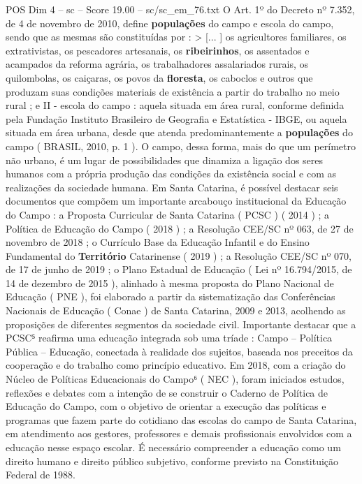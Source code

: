 \begin{textsample}{POS Dim 4 – sc – Score 19.00 – sc/sc\_em\_76.txt}
O Art. 1º do Decreto nº 7.352, de 4 de novembro de 2010, define \textbf{populações} do campo e escola do campo, sendo que as mesmas são constituídas por : > [... ] os agricultores familiares, os extrativistas, os pescadores artesanais, os \textbf{ribeirinhos}, os assentados e acampados da reforma agrária, os trabalhadores assalariados rurais, os quilombolas, os caiçaras, os povos da \textbf{floresta}, os caboclos e outros que produzam suas condições materiais de existência a partir do trabalho no meio rural ; e II - escola do campo : aquela situada em área rural, conforme definida pela Fundação Instituto Brasileiro de Geografia e Estatística - IBGE, ou aquela situada em área urbana, desde que atenda predominantemente a \textbf{populações} do campo ( BRASIL, 2010, p. 1 ).
O campo, dessa forma, mais do que um perímetro não urbano, é um lugar de possibilidades que dinamiza a ligação dos seres humanos com a própria produção das condições da existência social e com as realizações da sociedade humana.
Em Santa Catarina, é possível destacar seis documentos que compõem um importante arcabouço institucional da Educação do Campo : a Proposta Curricular de Santa Catarina ( PCSC ) ( 2014 ) ; a Política de Educação do Campo ( 2018 ) ; a Resolução CEE/SC nº 063, de 27 de novembro de 2018 ; o Currículo Base da Educação Infantil e do Ensino Fundamental do \textbf{Território} Catarinense ( 2019 ) ; a Resolução CEE/SC nº 070, de 17 de junho de 2019 ; o Plano Estadual de Educação ( Lei nº 16.794/2015, de 14 de dezembro de 2015 ), alinhado à mesma proposta do Plano Nacional de Educação ( PNE ), foi elaborado a partir da sistematização das Conferências Nacionais de Educação ( Conae ) de Santa Catarina, 2009 e 2013, acolhendo as proposições de diferentes segmentos da sociedade civil.
Importante destacar que a PCSC⁵ reafirma uma educação integrada sob uma tríade : Campo – Política Pública – Educação, conectada à realidade dos sujeitos, baseada nos preceitos da cooperação e do trabalho como princípio educativo.
Em 2018, com a criação do Núcleo de Políticas Educacionais do Campo⁶ ( NEC ), foram iniciados estudos, reflexões e debates com a intenção de se construir o Caderno de Política de Educação do Campo, com o objetivo de orientar a execução das políticas e programas que fazem parte do cotidiano das escolas do campo de Santa Catarina, em atendimento aos gestores, professores e demais profissionais envolvidos com a educação nesse espaço escolar.
É necessário compreender a educação como um direito humano e direito público subjetivo, conforme previsto na Constituição Federal de 1988.

\end{textsample}
